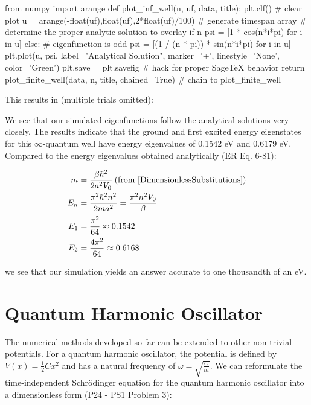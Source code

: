 \documentclass{article}
\begin{document}
\begin{sageblock}
from numpy import arange
def plot_inf_well(n, uf, data, title):
    plt.clf() # clear plot
    u = arange(-float(uf),float(uf),2*float(uf)/100) # generate timespan array
    # determine the proper analytic solution to overlay
    if n %
        psi = [1 * cos(n*i*pi) for i in u]
    else: # eigenfunction is odd
        psi = [(1 / (n * pi)) * sin(n*i*pi) for i in u]
    plt.plot(u, psi, label="Analytical Solution", marker='+', linestyle='None', color='Green')
    plt.save = plt.savefig # hack for proper SageTeX behavior
    return plot_finite_well(data, n, title, chained=True) # chain to plot_finite_well
\end{sageblock}

This results in (multiple trials omitted):

\begin{figure}[H]
\centering
{}
\end{figure}

\begin{figure}[H]
\centering
{}
\end{figure}

We see that our simulated eigenfunctions follow the analytical solutions very
closely. The results indicate that the ground and first excited energy
eigenstates for this $\infty$-quantum well have energy eigenvalues of 0.1542 eV
and 0.6179 eV.  Compared to the energy eigenvalues obtained analytically (ER Eq.
6-81):

\begin{align}
    m &= \frac{\beta\hbar^2}{2a^2V_0} \:(\text{from } \eqref{DimensionlessSubstitutions})\nonumber \\
    E_n &= \frac{\pi^2 \hbar^2 n^2}{2ma^2} = \frac{\pi^2n^2V_0}{\beta} \nonumber \\
    E_1 &= \frac{\pi^2}{64} \approx 0.1542 \\
    E_2 &= \frac{4\pi^2}{64} \approx 0.6168 
\end{align}

we see that our simulation yields an answer accurate to one thousandth of an eV.

\section{Quantum Harmonic Oscillator}
The numerical methods developed so far can be extended to other non-trivial
potentials. For a quantum harmonic oscillator, the potential is defined by
$V(x) = \frac{1}{2}Cx^2$ and has a natural frequency of $\omega =
\sqrt{\frac{C}{m}}$.  We can reformulate the time-independent Schr\"{o}dinger
equation for the quantum harmonic oscillator into a dimensionless form (P24 -
PS1 Problem 3):
\end{document}
